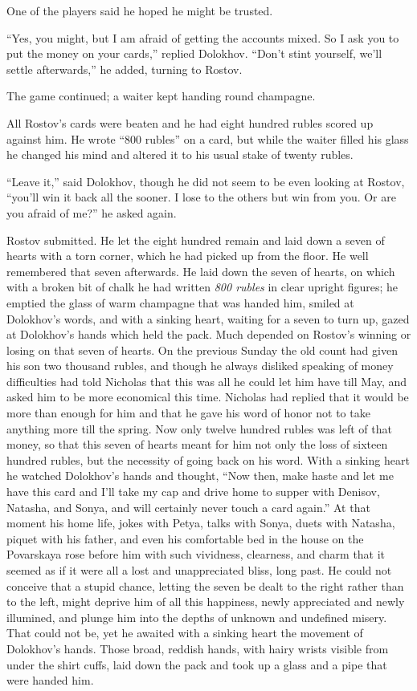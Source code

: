 One of the players said he hoped he might be trusted.

``Yes, you might, but I am afraid of getting the accounts
mixed. So I ask you to put the money on your cards,'' replied
Dolokhov. ``Don't stint yourself, we'll settle afterwards,'' he
added, turning to Rostov.

The game continued; a waiter kept handing round champagne.

All Rostov's cards were beaten and he had eight hundred rubles
scored up against him. He wrote ``800 rubles'' on a card, but
while the waiter filled his glass he changed his mind and altered
it to his usual stake of twenty rubles.

``Leave it,'' said Dolokhov, though he did not seem to be even
looking at Rostov, ``you'll win it back all the sooner. I lose to
the others but win from you. Or are you afraid of me?'' he asked
again.

Rostov submitted. He let the eight hundred remain and laid down a
seven of hearts with a torn corner, which he had picked up from
the floor. He well remembered that seven afterwards. He laid down
the seven of hearts, on which with a broken bit of chalk he had
written \emph{800 rubles} in clear upright figures; he emptied the
glass of warm champagne that was handed him, smiled at Dolokhov's
words, and with a sinking heart, waiting for a seven to turn up,
gazed at Dolokhov's hands which held the pack. Much depended on
Rostov's winning or losing on that seven of hearts. On the
previous Sunday the old count had given his son two thousand
rubles, and though he always disliked speaking of money
difficulties had told Nicholas that this was all he could let him
have till May, and asked him to be more economical this
time. Nicholas had replied that it would be more than enough for
him and that he gave his word of honor not to take anything more
till the spring. Now only twelve hundred rubles was left of that
money, so that this seven of hearts meant for him not only the
loss of sixteen hundred rubles, but the necessity of going back
on his word. With a sinking heart he watched Dolokhov's hands and
thought, ``Now then, make haste and let me have this card and
I'll take my cap and drive home to supper with Denisov, Natasha,
and Sonya, and will certainly never touch a card again.'' At that
moment his home life, jokes with Petya, talks with Sonya, duets
with Natasha, piquet with his father, and even his comfortable
bed in the house on the Povarskaya rose before him with such
vividness, clearness, and charm that it seemed as if it were all
a lost and unappreciated bliss, long past. He could not conceive
that a stupid chance, letting the seven be dealt to the right
rather than to the left, might deprive him of all this happiness,
newly appreciated and newly illumined, and plunge him into the
depths of unknown and undefined misery. That could not be, yet he
awaited with a sinking heart the movement of Dolokhov's
hands. Those broad, reddish hands, with hairy wrists visible from
under the shirt cuffs, laid down the pack and took up a glass and
a pipe that were handed him.

